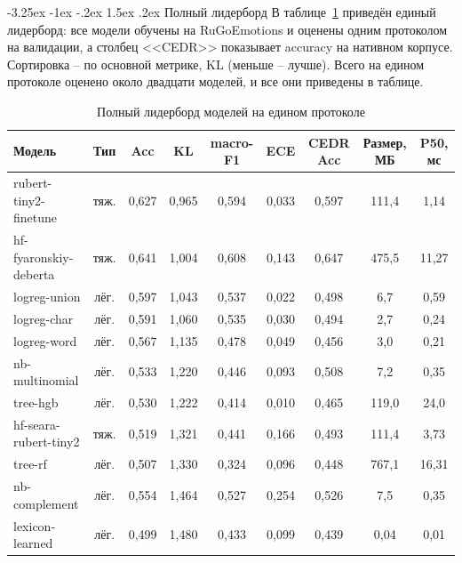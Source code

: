 \documentclass[12pt,a4paper]{report}
\makeatletter
\renewcommand{\subsection}{\@startsection{subsection}{2}{\z@}%
  {-3.25ex \@plus -1ex \@minus -.2ex}%
  {1.5ex \@plus .2ex}%
  {\normalfont\large\bfseries\centering}}
\makeatother
\begin{document}
\subsection{Полный лидерборд}
В таблице~\ref{tab:leaderboard} приведён единый лидерборд: все модели обучены на RuGoEmotions и оценены одним протоколом на валидации, а столбец <<CEDR>> показывает accuracy на нативном корпусе. Сортировка -- по основной метрике, KL (меньше -- лучше). Всего на едином протоколе оценено около двадцати моделей, и все они приведены в таблице.

\begin{table}[H]
  \caption{Полный лидерборд моделей на едином протоколе}
  \label{tab:leaderboard}
  \centering
  {\scriptsize
  \setlength{\tabcolsep}{3pt}
  \renewcommand{\arraystretch}{0.86}
  \begin{tabular}{|p{3.3cm}|c|c|c|c|c|c|c|c|}
    \hline
    Модель & Тип & Acc & KL & macro-F1 & ECE & CEDR Acc & Размер, МБ & P50, мс \\
    \hline
    rubert-tiny2-finetune & тяж. & 0{,}627 & 0{,}965 & 0{,}594 & 0{,}033 & 0{,}597 & 111{,}4 & 1{,}14 \\
    \hline
    hf-fyaronskiy-deberta & тяж. & 0{,}641 & 1{,}004 & 0{,}608 & 0{,}143 & 0{,}647 & 475{,}5 & 11{,}27 \\
    \hline
    logreg-union & лёг. & 0{,}597 & 1{,}043 & 0{,}537 & 0{,}022 & 0{,}498 & 6{,}7 & 0{,}59 \\
    \hline
    logreg-char & лёг. & 0{,}591 & 1{,}060 & 0{,}535 & 0{,}030 & 0{,}494 & 2{,}7 & 0{,}24 \\
    \hline
    logreg-word & лёг. & 0{,}567 & 1{,}135 & 0{,}478 & 0{,}049 & 0{,}456 & 3{,}0 & 0{,}21 \\
    \hline
    nb-multinomial & лёг. & 0{,}533 & 1{,}220 & 0{,}446 & 0{,}093 & 0{,}508 & 7{,}2 & 0{,}35 \\
    \hline
    tree-hgb & лёг. & 0{,}530 & 1{,}222 & 0{,}414 & 0{,}010 & 0{,}465 & 119{,}0 & 24{,}0 \\
    \hline
    hf-seara-rubert-tiny2 & тяж. & 0{,}519 & 1{,}321 & 0{,}441 & 0{,}166 & 0{,}493 & 111{,}4 & 3{,}73 \\
    \hline
    tree-rf & лёг. & 0{,}507 & 1{,}330 & 0{,}324 & 0{,}096 & 0{,}448 & 767{,}1 & 16{,}31 \\
    \hline
    nb-complement & лёг. & 0{,}554 & 1{,}464 & 0{,}527 & 0{,}254 & 0{,}526 & 7{,}5 & 0{,}35 \\
    \hline
    lexicon-learned & лёг. & 0{,}499 & 1{,}480 & 0{,}433 & 0{,}099 & 0{,}439 & 0{,}04 & 0{,}01 \\

\end{tabular}}
\end{table}
\end{document}
